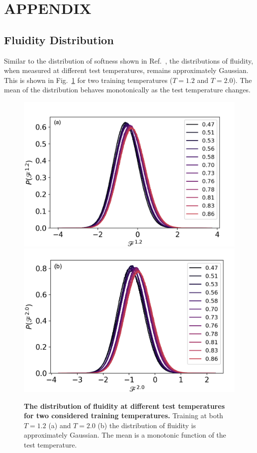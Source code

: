 \documentclass[aps,reprint,superscriptaddress,nofootinbib, notitlepage,prl]{revtex4-2}
\begin{document}



\appendix
\section{APPENDIX}
\label{appendix}

\subsection{Fluidity Distribution}\label{sec:fluidityDistribution}
\label{sec:FluidDist}

Similar to the distribution of softness shown in Ref.~\cite{schoenholz2016structural}, the distributions of fluidity, when measured at different test temperatures, remains approximately Gaussian. This is shown in Fig.~\ref{fig:fluiditydistributionforT1.2_2} for two training temperatures ($T= 1.2$ and $T=2.0$). The mean of the distribution behaves monotonically as the test temperature changes.

\begin{figure}[ht]
    \centering
    \includegraphics[width =1.0\linewidth]{SM_fluidityDist12}
    \includegraphics[width =1.0\linewidth]{SM_fluidityDist20}
    \caption{ \textbf{The distribution of fluidity  at different test temperatures for two considered training temperatures.} Training at both $T=1.2$  (a) and $T=2.0$ (b) the distribution of fluidity is approximately Gaussian. The mean is a monotonic function of the test temperature.}
    \label{fig:fluiditydistributionforT1.2_2}
\end{figure}
\end{document}
